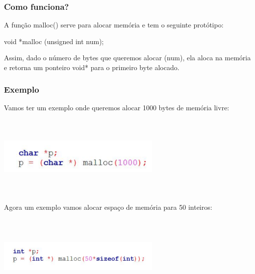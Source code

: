 \documentclass{report}
\begin{document}
	\subsubsection{Como funciona?}
	
	A função malloc() serve para alocar memória e tem o seguinte protótipo:
	
	\begin{center}
		\begin{LARGE}
			void *malloc (unsigned int num);
		\end{LARGE}
	\end{center}
	
	Assim, dado o número de bytes que queremos alocar (num), ela aloca na memória e retorna um ponteiro void* para o primeiro byte alocado.
	
	\subsubsection{Exemplo}
	
	Vamos ter um exemplo onde queremos alocar 1000 bytes de memória livre:
	
	\begin{center}
		
		\includegraphics[width=8cm,height=4cm,keepaspectratio=false]{imagens/dynamicaloc2.png}
		
	\end{center}
	
	
	Agora um exemplo vamos alocar espaço de memória para 50 inteiros:
	
	
	\begin{center}
		
		\includegraphics[width=8cm,height=4cm,keepaspectratio=false]{imagens/dynamicaloc3.png}
		
	\end{center}
	
\end{document}
